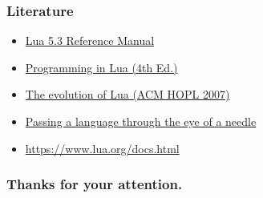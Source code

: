 \documentclass{beamer}
\begin{document}
\fi

\begin{frame}
  \frametitle{Literature}

  \begin{itemize}
  \item \href{https://www.lua.org/manual/5.3/}{Lua 5.3 Reference Manual}
  \item \href{https://www.lua.org/pil/}{Programming in Lua (4th Ed.)}
  \item \href{https://www.lua.org/doc/hopl.pdf}{The evolution of Lua (ACM HOPL 2007)}
  \item \href{https://dl.acm.org/citation.cfm?id=1983083}{Passing a language through the eye of a needle}
  \item \href{https://www.lua.org/docs.html}{https://www.lua.org/docs.html}
  \end{itemize}
\end{frame}

\begin{frame}
  \frametitle{Thanks for your attention.}
\end{frame}
\end{document}

